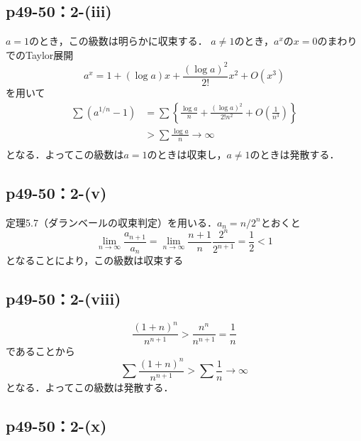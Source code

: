 \documentclass[uplatex,dvipdfmx,a4paper,10pt,fleqn]{jsarticle}
\begin{document}
    \subsection*{p49-50：2-(iii)}

	\begin{screen}
	$a=1$のとき，この級数は明らかに収束する．
	$a \neq 1$のとき，$a^x$の$x=0$のまわりでのTaylor展開
	\[
	a^x=1+(\log a)x+\frac{(\log a)^2}{2!}x^2+O(x^3)
	\]
	を用いて
	\begin{align*}
	\sum (a^{1/n}-1)&=\sum \left\{ \frac{\log a}{n}+\frac{(\log a)^2}{2!n^2}+O\left(\frac{1}{n^3}\right)\right\}\\
	&>\sum \frac{\log a}{n} \rightarrow \infty\\
	\end{align*}
	となる．よってこの級数は$a=1$のときは収束し，$a \neq 1$のときは発散する．
	\end{screen}


    \subsection*{p49-50：2-(v)}


	\begin{screen}
        定理5.7（ダランベールの収束判定）を用いる．$a_n=n/2^n$とおくと
        \[
        \lim_{n \to \infty}\frac{a_{n+1}}{a_n}=\lim_{n \to \infty}\frac{n+1}{n}\frac{2^n}{2^{n+1}}=\frac{1}{2}<1
        \]
        となることにより，この級数は収束する
        \end{screen}
        

    \subsection*{p49-50：2-(viii)}

        \begin{screen}
        \[
        \frac{(1+n)^n}{n^{n+1}}>\frac{n^n}{n^{n+1}}=\frac{1}{n}
        \]
        であることから
        \[
        \sum \frac{(1+n)^n}{n^{n+1}}>\sum \frac{1}{n} \rightarrow \infty
        \]
        となる．よってこの級数は発散する．
        \end{screen}
        

        \subsection*{p49-50：2-(x)}
\end{document}
